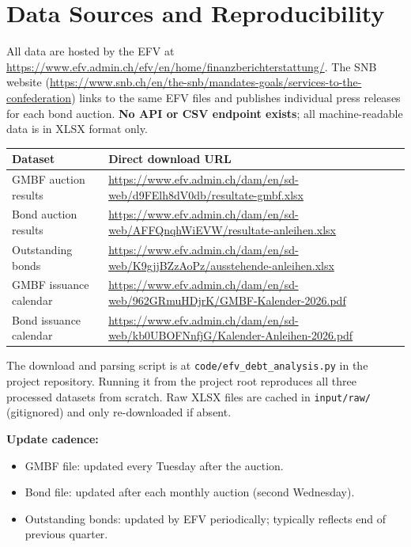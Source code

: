 \documentclass[12pt,a4paper]{article}
\begin{document}
\section{Data Sources and Reproducibility}

All data are hosted by the EFV at
\url{https://www.efv.admin.ch/efv/en/home/finanzberichterstattung/}.
The SNB website (\url{https://www.snb.ch/en/the-snb/mandates-goals/services-to-the-confederation})
links to the same EFV files and publishes individual press releases for each
bond auction.  \textbf{No API or CSV endpoint exists}; all machine-readable data
is in XLSX format only.

\begin{center}
\begin{tabular}{L{3.5cm} L{10.5cm}}
  \toprule
  \textbf{Dataset} & \textbf{Direct download URL} \\
  \midrule
  GMBF auction results &
    \url{https://www.efv.admin.ch/dam/en/sd-web/d9FElh8dV0db/resultate-gmbf.xlsx} \\[4pt]
  Bond auction results &
    \url{https://www.efv.admin.ch/dam/en/sd-web/AFFQnqhWiEVW/resultate-anleihen.xlsx} \\[4pt]
  Outstanding bonds &
    \url{https://www.efv.admin.ch/dam/en/sd-web/K9gjjBZzAoPz/ausstehende-anleihen.xlsx} \\[4pt]
  GMBF issuance calendar &
    \url{https://www.efv.admin.ch/dam/en/sd-web/962GRmuHDjrK/GMBF-Kalender-2026.pdf} \\[4pt]
  Bond issuance calendar &
    \url{https://www.efv.admin.ch/dam/en/sd-web/kb0UBOFNnfjG/Kalender-Anleihen-2026.pdf} \\
  \bottomrule
\end{tabular}
\end{center}

\medskip
\noindent The download and parsing script is at
\texttt{code/efv\_debt\_analysis.py} in the project repository.  Running it
from the project root reproduces all three processed datasets from scratch.
Raw XLSX files are cached in \texttt{input/raw/} (gitignored) and only
re-downloaded if absent.

\medskip
\noindent\textbf{Update cadence:}
\begin{itemize}[leftmargin=1.5em, itemsep=2pt]
  \item GMBF file: updated every Tuesday after the auction.
  \item Bond file: updated after each monthly auction (second Wednesday).
  \item Outstanding bonds: updated by EFV periodically; typically reflects
    end of previous quarter.
\end{itemize}

\end{document}

